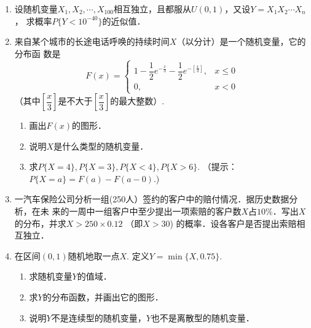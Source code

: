 \documentclass[10pt,a4paper]{article}
\begin{document}
\begin{enumerate}
    \item 设随机变量$X_1,X_2,\cdots,X_{100}$相互独立，且都服从$U(0,1)$，又设$Y=X_1X_2 \cdots X_n$，
    求概率$P\{Y<10^{-40}\}$的近似值．



    \item 来自某个城市的长途电话呼唤的持续时间$X$（以分计）是一个随机变量，它的分布函
    数是
    $$F(x)=\left\{\begin{array}{ll}
        1-\dfrac{1}{2}e^{-\frac{x}{3}}-\dfrac{1}{2}e^{-[\frac{x}{3}]}, & x\leq 0\\
        0, & x<0
    \end{array}\right.$$
    （其中$[\dfrac{x}{3}]$是不大于$[\dfrac{x}{3}]$的最大整数）.
    \begin{enumerate}
        \item 画出$F(x)$的图形．
        \item 说明$X$是什么类型的随机变量．
        \item 求$P\{X=4\},P\{X=3\},P\{X<4\},P\{X>6\}$. （提示：$P\{X=a\}=F(a)-F(a-0)$.)
    \end{enumerate}




    \item 一汽车保险公司分析一组(250人）签约的客户中的赔付情况．据历史数据分析，在未
    来的一周中一组客户中至少提出一项索赔的客户数$X$占$10\%$．写出$X$的分布，并求$X>250\times 0.12$
   （即$X>30$) 的概率．设各客户是否提出索赔相互独立．



   \item 在区间$(0,1)$随机地取一点$X$. 定义$Y=\min \{X,0.75\}$.
   \begin{enumerate}
       \item 求随机变量$Y$的值域．
       \item 求$Y$的分布函数，并画出它的图形．
       \item 说明$Y$不是连续型的随机变量，$Y$也不是离散型的随机变量．
   \end{enumerate}

    

    

  

\end{enumerate}
\end{document}
